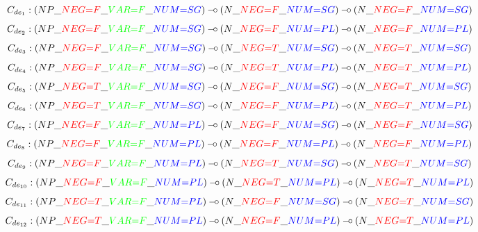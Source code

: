 $$
C_{de_1} : (NP\_\textcolor{red}{NEG{=}F}\_\textcolor{green}{VAR{=}F}\_\textcolor{blue}{NUM{=}SG}) \mathbin{{-}\mkern-3.5mu{\circ}} (N\_\textcolor{red}{NEG{=}F}\_\textcolor{blue}{NUM{=}SG}) \mathbin{{-}\mkern-3.5mu{\circ}} (N\_\textcolor{red}{NEG{=}F}\_\textcolor{blue}{NUM{=}SG})
$$
$$
C_{de_2} : (NP\_\textcolor{red}{NEG{=}F}\_\textcolor{green}{VAR{=}F}\_\textcolor{blue}{NUM{=}SG}) \mathbin{{-}\mkern-3.5mu{\circ}} (N\_\textcolor{red}{NEG{=}F}\_\textcolor{blue}{NUM{=}PL}) \mathbin{{-}\mkern-3.5mu{\circ}} (N\_\textcolor{red}{NEG{=}F}\_\textcolor{blue}{NUM{=}PL})
$$
$$
C_{de_3} : (NP\_\textcolor{red}{NEG{=}F}\_\textcolor{green}{VAR{=}F}\_\textcolor{blue}{NUM{=}SG}) \mathbin{{-}\mkern-3.5mu{\circ}} (N\_\textcolor{red}{NEG{=}T}\_\textcolor{blue}{NUM{=}SG}) \mathbin{{-}\mkern-3.5mu{\circ}} (N\_\textcolor{red}{NEG{=}T}\_\textcolor{blue}{NUM{=}SG})
$$
$$
C_{de_4} : (NP\_\textcolor{red}{NEG{=}F}\_\textcolor{green}{VAR{=}F}\_\textcolor{blue}{NUM{=}SG}) \mathbin{{-}\mkern-3.5mu{\circ}} (N\_\textcolor{red}{NEG{=}T}\_\textcolor{blue}{NUM{=}PL}) \mathbin{{-}\mkern-3.5mu{\circ}} (N\_\textcolor{red}{NEG{=}T}\_\textcolor{blue}{NUM{=}PL})
$$
$$
C_{de_5} : (NP\_\textcolor{red}{NEG{=}T}\_\textcolor{green}{VAR{=}F}\_\textcolor{blue}{NUM{=}SG}) \mathbin{{-}\mkern-3.5mu{\circ}} (N\_\textcolor{red}{NEG{=}F}\_\textcolor{blue}{NUM{=}SG}) \mathbin{{-}\mkern-3.5mu{\circ}} (N\_\textcolor{red}{NEG{=}T}\_\textcolor{blue}{NUM{=}SG})
$$
$$
C_{de_6} : (NP\_\textcolor{red}{NEG{=}T}\_\textcolor{green}{VAR{=}F}\_\textcolor{blue}{NUM{=}SG}) \mathbin{{-}\mkern-3.5mu{\circ}} (N\_\textcolor{red}{NEG{=}F}\_\textcolor{blue}{NUM{=}PL}) \mathbin{{-}\mkern-3.5mu{\circ}} (N\_\textcolor{red}{NEG{=}T}\_\textcolor{blue}{NUM{=}PL})
$$
$$
C_{de_7} : (NP\_\textcolor{red}{NEG{=}F}\_\textcolor{green}{VAR{=}F}\_\textcolor{blue}{NUM{=}PL}) \mathbin{{-}\mkern-3.5mu{\circ}} (N\_\textcolor{red}{NEG{=}F}\_\textcolor{blue}{NUM{=}SG}) \mathbin{{-}\mkern-3.5mu{\circ}} (N\_\textcolor{red}{NEG{=}F}\_\textcolor{blue}{NUM{=}SG})
$$
$$
C_{de_8} : (NP\_\textcolor{red}{NEG{=}F}\_\textcolor{green}{VAR{=}F}\_\textcolor{blue}{NUM{=}PL}) \mathbin{{-}\mkern-3.5mu{\circ}} (N\_\textcolor{red}{NEG{=}F}\_\textcolor{blue}{NUM{=}PL}) \mathbin{{-}\mkern-3.5mu{\circ}} (N\_\textcolor{red}{NEG{=}F}\_\textcolor{blue}{NUM{=}PL})
$$
$$
C_{de_9} : (NP\_\textcolor{red}{NEG{=}F}\_\textcolor{green}{VAR{=}F}\_\textcolor{blue}{NUM{=}PL}) \mathbin{{-}\mkern-3.5mu{\circ}} (N\_\textcolor{red}{NEG{=}T}\_\textcolor{blue}{NUM{=}SG}) \mathbin{{-}\mkern-3.5mu{\circ}} (N\_\textcolor{red}{NEG{=}T}\_\textcolor{blue}{NUM{=}SG})
$$
$$
C_{de_{10}} : (NP\_\textcolor{red}{NEG{=}F}\_\textcolor{green}{VAR{=}F}\_\textcolor{blue}{NUM{=}PL}) \mathbin{{-}\mkern-3.5mu{\circ}} (N\_\textcolor{red}{NEG{=}T}\_\textcolor{blue}{NUM{=}PL}) \mathbin{{-}\mkern-3.5mu{\circ}} (N\_\textcolor{red}{NEG{=}T}\_\textcolor{blue}{NUM{=}PL})
$$
$$
C_{de_{11}} : (NP\_\textcolor{red}{NEG{=}T}\_\textcolor{green}{VAR{=}F}\_\textcolor{blue}{NUM{=}PL}) \mathbin{{-}\mkern-3.5mu{\circ}} (N\_\textcolor{red}{NEG{=}F}\_\textcolor{blue}{NUM{=}SG}) \mathbin{{-}\mkern-3.5mu{\circ}} (N\_\textcolor{red}{NEG{=}T}\_\textcolor{blue}{NUM{=}SG})
$$
$$
C_{de_{12}} : (NP\_\textcolor{red}{NEG{=}T}\_\textcolor{green}{VAR{=}F}\_\textcolor{blue}{NUM{=}PL}) \mathbin{{-}\mkern-3.5mu{\circ}} (N\_\textcolor{red}{NEG{=}F}\_\textcolor{blue}{NUM{=}PL}) \mathbin{{-}\mkern-3.5mu{\circ}} (N\_\textcolor{red}{NEG{=}T}\_\textcolor{blue}{NUM{=}PL})
$$

